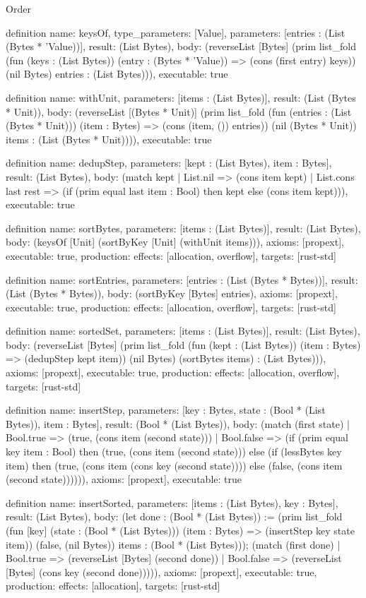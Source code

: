 \begin{lexlean}{Order}
\begin{semanticmodule}
definition{
  name: keysOf,
  type_parameters: [Value],
  parameters: [entries : (List (Bytes * 'Value))],
  result: (List Bytes),
  body: (reverseList [Bytes] (prim list_fold (fun (keys : (List Bytes)) (entry : (Bytes * 'Value)) => (cons (first entry) keys)) (nil Bytes) entries : (List Bytes))),
  executable: true
}

definition{
  name: withUnit,
  parameters: [items : (List Bytes)],
  result: (List (Bytes * Unit)),
  body: (reverseList [(Bytes * Unit)] (prim list_fold (fun (entries : (List (Bytes * Unit))) (item : Bytes) => (cons (item, ()) entries)) (nil (Bytes * Unit)) items : (List (Bytes * Unit)))),
  executable: true
}

definition{
  name: dedupStep,
  parameters: [kept : (List Bytes), item : Bytes],
  result: (List Bytes),
  body: (match kept
    | List.nil => (cons item kept)
    | List.cons last rest => (if (prim equal last item : Bool) then kept else (cons item kept))),
  executable: true
}

definition{
  name: sortBytes,
  parameters: [items : (List Bytes)],
  result: (List Bytes),
  body: (keysOf [Unit] (sortByKey [Unit] (withUnit items))),
  axioms: [propext],
  executable: true,
  production: {effects: [allocation, overflow], targets: [rust-std]}
}

definition{
  name: sortEntries,
  parameters: [entries : (List (Bytes * Bytes))],
  result: (List (Bytes * Bytes)),
  body: (sortByKey [Bytes] entries),
  axioms: [propext],
  executable: true,
  production: {effects: [allocation, overflow], targets: [rust-std]}
}

definition{
  name: sortedSet,
  parameters: [items : (List Bytes)],
  result: (List Bytes),
  body: (reverseList [Bytes] (prim list_fold (fun (kept : (List Bytes)) (item : Bytes) => (dedupStep kept item)) (nil Bytes) (sortBytes items) : (List Bytes))),
  axioms: [propext],
  executable: true,
  production: {effects: [allocation, overflow], targets: [rust-std]}
}

definition{
  name: insertStep,
  parameters: [key : Bytes, state : (Bool * (List Bytes)), item : Bytes],
  result: (Bool * (List Bytes)),
  body: (match (first state)
    | Bool.true => (true, (cons item (second state)))
    | Bool.false => (if (prim equal key item : Bool) then (true, (cons item (second state))) else (if (lessBytes key item) then (true, (cons item (cons key (second state)))) else (false, (cons item (second state)))))),
  axioms: [propext],
  executable: true
}

definition{
  name: insertSorted,
  parameters: [items : (List Bytes), key : Bytes],
  result: (List Bytes),
  body: (let done : (Bool * (List Bytes)) := (prim list_fold (fun [key] (state : (Bool * (List Bytes))) (item : Bytes) => (insertStep key state item)) (false, (nil Bytes)) items : (Bool * (List Bytes))); (match (first done)
    | Bool.true => (reverseList [Bytes] (second done))
    | Bool.false => (reverseList [Bytes] (cons key (second done))))),
  axioms: [propext],
  executable: true,
  production: {effects: [allocation], targets: [rust-std]}
}


\end{semanticmodule}
\end{lexlean}
